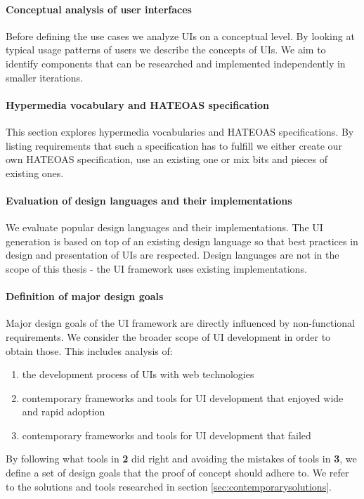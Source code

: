 \paragraph{Conceptual analysis of user interfaces}
Before defining the use cases we analyze UIs on a conceptual level. By looking at typical usage patterns of users we describe the concepts of UIs. We aim to identify components that can be researched and implemented independently in smaller iterations.

\paragraph{Hypermedia vocabulary and HATEOAS specification}
This section explores hypermedia vocabularies and HATEOAS specifications. By listing requirements that such a specification has to fulfill we either create our own HATEOAS specification, use an existing one or mix bits and pieces of existing ones.

\paragraph{Evaluation of design languages and their implementations}
We evaluate popular design languages and their implementations. The UI generation is based on top of an existing design language so that best practices in design and presentation of UIs are respected. Design languages are not in the scope of this thesis - the UI framework uses existing implementations.

\paragraph{Definition of major design goals}
Major design goals of the UI framework are directly influenced by non-functional requirements. We consider the broader scope of UI development in order to obtain those. This includes analysis of:

\begin{enumerate}
  \item the development process of UIs with web technologies
  \item contemporary frameworks and tools for UI development that enjoyed wide and rapid adoption
  \item contemporary frameworks and tools for UI development that failed
\end{enumerate}

By following what tools in \textbf{2} did right and avoiding the mistakes of tools in \textbf{3}, we define a set of design goals that the proof of concept should adhere to. We refer to the solutions and tools researched in section \ref{sec:contemporarysolutions}.

